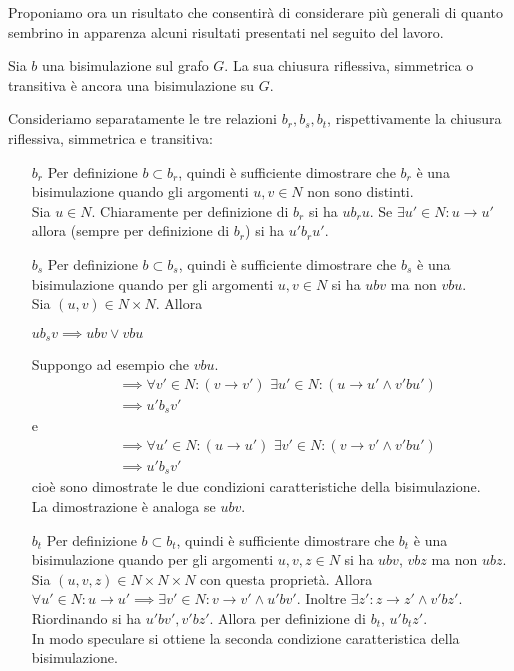 Proponiamo ora un risultato che consentirà di considerare più generali di quanto sembrino in apparenza alcuni risultati presentati nel seguito del lavoro.
\begin{theorem}
    Sia $b$ una bisimulazione sul grafo $G$. La sua chiusura riflessiva, simmetrica o transitiva è ancora una bisimulazione su $G$.
\end{theorem}
\begin{proof2}
    Consideriamo separatamente le tre relazioni $b_r, b_s, b_t$, rispettivamente la chiusura riflessiva, simmetrica e transitiva:
    \begin{itemize}
        \item[$b_r$] Per definizione $b \subset b_r$, quindi è sufficiente dimostrare che $b_r$ è una bisimulazione quando gli argomenti $u,v \in N$ non sono distinti.\\
        Sia $u \in N$. Chiaramente per definizione di $b_r$ si ha $u b_r u$. Se $\exists u' \in N : u \to u'$ allora (sempre per definizione di $b_r$) si ha $u' b_r u'$.
        \item[$b_s$] Per definizione $b \subset b_s$, quindi è sufficiente dimostrare che $b_s$ è una bisimulazione quando per gli argomenti $u,v \in N$ si ha $u b v$ ma non $v b u$.\\
        Sia $(u,v) \in N \times N$. Allora
        \begin{center}
            $u b_s v \implies u b v \lor v b u$
        \end{center}
        Suppongo ad esempio che $v b u$.
        \begin{align*}
            &\implies \forall v' \in N : (v \to v') \,\,\exists u' \in N : (u \to u' \land v' bu')\\
            &\implies u' b_s v'
        \end{align*}
        e
        \begin{align*}
            &\implies \forall u' \in N : (u \to u') \,\,\exists v' \in N : (v \to v' \land v' bu')\\
            &\implies u' b_s v'
        \end{align*}
        cioè sono dimostrate le due condizioni caratteristiche della bisimulazione.\\
        La dimostrazione è analoga se $u b v$.
        \item[$b_t$] Per definizione $b \subset b_t$, quindi è sufficiente dimostrare che $b_t$ è una bisimulazione quando per gli argomenti $u,v,z \in N$ si ha $u b v$, $v b z$ ma non $u b z$.\\
        Sia $(u,v,z) \in N \times N \times N$ con questa proprietà. Allora $\forall u' \in N : u \to u' \implies \exists v' \in N : v \to v' \land u' b v'$. Inoltre $\exists z' : z \to z' \land v' b z'$.\\
        Riordinando si ha $u' b v', v' b z'$. Allora per definizione di $b_t, \, u' b_t z'$.\\
        In modo speculare si ottiene la seconda condizione caratteristica della bisimulazione.
    \end{itemize}
\end{proof2}
